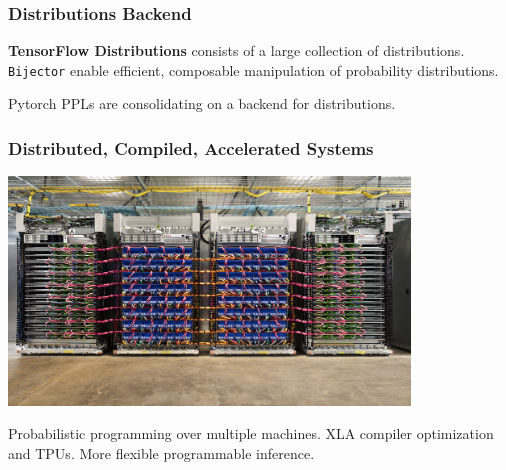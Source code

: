 \documentclass[10pt,
               xcolor={usenames,dvipsnames},
               hyperref={colorlinks,linktoc=all,citecolor=Plum,linkcolor=MidnightBlue,urlcolor=MidnightBlue},noamssymb]{beamer}
\begin{document}
\begin{frame}
\frametitle{Distributions Backend}
\vspace{-3ex}


\textbf{TensorFlow Distributions} consists of a large collection of
distributions. \texttt{Bijector} enable efficient, composable
manipulation of probability distributions.

Pytorch PPLs are consolidating on a backend for distributions.
\end{frame}

\begin{frame}
\frametitle{Distributed, Compiled, Accelerated Systems}
\begin{center}
\vspace{-1.25ex}
\includegraphics[width=0.8\textwidth]{img/tpu-pods.png}
\end{center}

\vspace{3ex}
Probabilistic programming over multiple machines.
XLA compiler optimization and TPUs.
More flexible programmable inference.
\end{frame}
\end{document}
